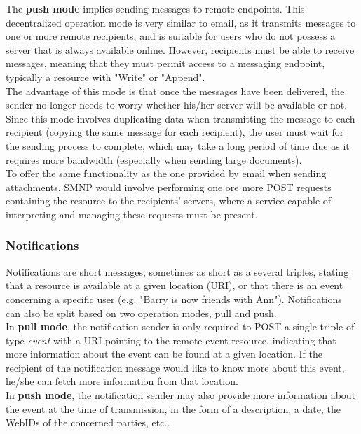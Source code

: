 The \textbf{push mode} implies sending messages to remote endpoints. This decentralized operation mode is very similar to email, as it transmits messages to one or more remote recipients, and is suitable for users who do not possess a server that is always available online. However, recipients must be able to receive messages, meaning that they must permit access to a messaging endpoint, typically a resource with "Write" or "Append".\\

The advantage of this mode is that once the messages have been delivered, the sender no longer needs to worry whether his/her server will be available or not. Since this mode involves duplicating data when transmitting the message to each recipient (copying the same message for each recipient), the user must wait for the sending process to complete, which may take a long period of time due as it requires more bandwidth (especially when sending large documents).\\

To offer the same functionality as the one provided by email when sending attachments, SMNP would involve performing one ore more POST requests containing the resource to the recipients' servers, where a service capable of interpreting and managing these requests must be present.

\subsubsection{Notifications}
\label{subsubsec:notifications}
Notifications are short messages, sometimes as short as a several triples, stating that a resource is available at a given location (URI), or that there is an event concerning a specific user (e.g. "Barry is now friends with Ann"). Notifications can also be split based on two operation modes, pull and push.\\

In \textbf{pull mode}, the notification sender is only required to POST a single triple of type \textit{event} with a URI pointing to the remote event resource, indicating that more information about the event can be found at a given location. If the recipient of the notification message would like to know more about this event, he/she can fetch more information from that location.\\

In \textbf{push mode}, the notification sender may also provide more information about the event at the time of transmission, in the form of a description, a date, the WebIDs of the concerned parties, etc..

